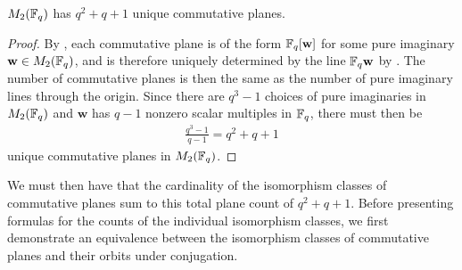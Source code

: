 \documentclass{amsart}
\begin{document}
\begin{theorem}\label{total-count}
    $M_2(\protect\mathbb{F}_q)$ has $q^2 + q + 1$ unique commutative planes.
\end{theorem}
\begin{proof}
    By , each commutative plane is of the form $\protect\mathbb{F}_q[\mathbf{w}]$ for some pure imaginary $\mathbf{w} \in M_2(\protect\mathbb{F}_q)$, and is therefore uniquely determined by the line $\protect\mathbb{F}_q \mathbf{w}$ by . The number of commutative planes is then the same as the number of pure imaginary lines through the origin. Since there are $q^3 -1$ choices of pure imaginaries in $M_2(\protect\mathbb{F}_q)$ and $\mathbf{w}$ has $q-1$ nonzero scalar multiples in $\protect\mathbb{F}_q$, there must then be
    \begin{align*}
        \frac{q^3 - 1}{q - 1} = q^2 + q + 1
    \end{align*}
    unique commutative planes in $M_2(\protect\mathbb{F}_q)$. 
%
%
%    
    \end{proof} 
    We must then have that the cardinality of the isomorphism classes of commutative planes sum to this total plane count of $q^2 + q + 1$. Before presenting formulas for the counts of the individual isomorphism classes, we first demonstrate an equivalence between the isomorphism classes of commutative planes and their orbits under conjugation.
\end{document}
